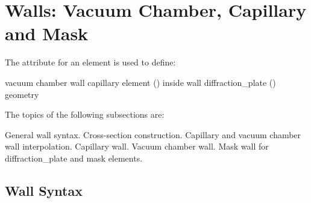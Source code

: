 \section{Walls: Vacuum Chamber, Capillary and Mask}
\label{s:wall}

The  attribute for an element is used to define:
\begin{example}
  vacuum chamber wall
  capillary element () inside wall
  diffraction_plate () geometry
\end{example}

The topics of the following subsections are:
\begin{example}
        General wall syntax.
        Cross-section construction. 
        Capillary and vacuum chamber wall interpolation.
        Capillary wall.
        Vacuum chamber wall.
        Mask wall for diffraction_plate and mask elements.
\end{example}

\subsection{Wall Syntax}
\label{s:wall.syntax}

